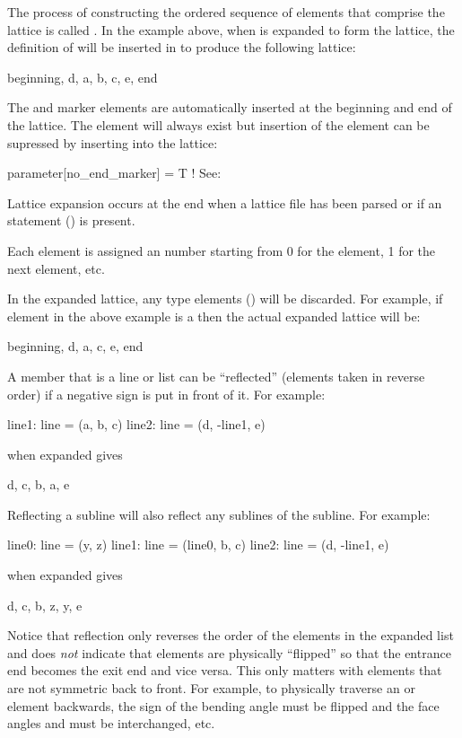 The process of constructing the ordered sequence of elements that
comprise the lattice is called . In the example
above, when  is expanded to form the lattice, the definition
of  will be inserted in to produce the following lattice:
\begin{example}
  beginning, d, a, b, c, e, end
\end{example}
The  and  marker elements are automatically inserted
at the beginning and end of the lattice. The  element will
always exist but insertion of the  element can be supressed by inserting
into the lattice:
\begin{example}
 parameter[no_end_marker] = T    ! See: 
\end{example}
Lattice expansion occurs at the end when a lattice file has been
parsed or if an  statement () is
present.

Each element is assigned an  number starting from 0
for the  element, 1 for the next element, etc.

In the expanded lattice, any  type elements
() will be discarded. For example, if element 
in the above example is a  then the actual expanded
lattice will be:
\begin{example}
  beginning, d, a, c, e, end
\end{example}

A member that is a line or list can be ``reflected''
(elements taken in reverse order) if
a negative sign is put in front of it. For example:
\begin{example}
  line1: line = (a, b, c)
  line2: line = (d, -line1, e)
\end{example}
 when expanded gives
\begin{example}
  d, c, b, a, e
\end{example}
Reflecting a subline will also reflect any sublines of the subline. For
example:
\begin{example}
  line0: line = (y, z)
  line1: line = (line0, b, c)
  line2: line = (d, -line1, e)
\end{example}
 when expanded gives
\begin{example}
  d, c, b, z, y, e
\end{example}
Notice that reflection only reverses the order of the elements in the
expanded list and does {\em not} indicate that elements are physically
``flipped'' so that the entrance end becomes the exit end and vice
versa. This only matters with elements that are not symmetric back to
front. For example, to physically traverse an  or 
element backwards, the sign of the bending angle must be flipped and
the face angles  and  must be interchanged, etc.

